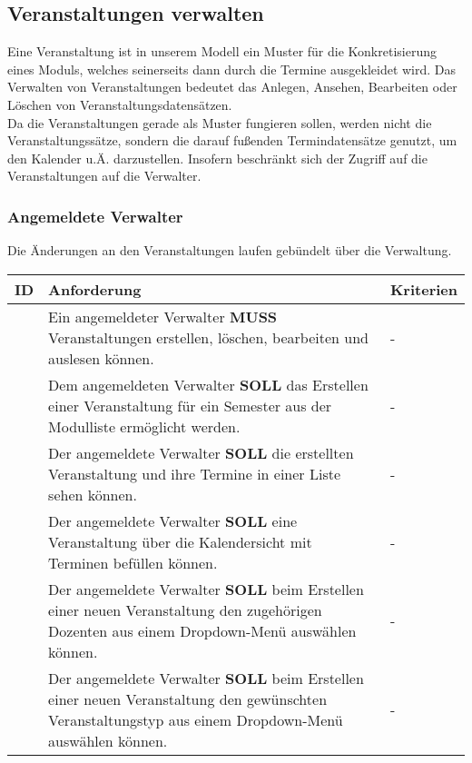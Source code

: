 \newpage

\subsection{Veranstaltungen verwalten}
Eine Veranstaltung ist in unserem Modell ein Muster für die Konkretisierung eines Moduls, welches seinerseits dann durch die Termine ausgekleidet wird. Das Verwalten von Veranstaltungen 
bedeutet das Anlegen, Ansehen, Bearbeiten oder Löschen von Veranstaltungsdatensätzen.\\
Da die Veranstaltungen gerade als Muster fungieren sollen,  werden nicht die Veranstaltungssätze, sondern die darauf fußenden Termindatensätze genutzt, um den Kalender u.Ä. darzustellen. Insofern beschränkt sich der Zugriff auf die Veranstaltungen auf die Verwalter.

\vspace{12pt}

\subsubsection{Angemeldete Verwalter }
Die Änderungen an den Veranstaltungen laufen gebündelt über die Verwaltung.

\vspace{12pt}

\begin{tabular} {|p{}|p{}|p{}|}
	\hline
	ID & Anforderung & Kriterien \\
	\hline
	\printfreqnr
	& Ein angemeldeter Verwalter \textbf{MUSS} Veranstaltungen erstellen, löschen, bearbeiten und auslesen können.
	& - \\
	\hline
	\printfreqnr
	& Dem angemeldeten Verwalter \textbf{SOLL} das Erstellen einer Veranstaltung für ein Semester aus der Modulliste ermöglicht werden.
	& - \\
	\hline
	\printfreqnr
	& Der angemeldete Verwalter \textbf{SOLL} die erstellten Veranstaltung und ihre Termine in einer Liste sehen können. 
	& - \\
	\hline
	\printfreqnr
	& Der angemeldete Verwalter \textbf{SOLL} eine Veranstaltung über die Kalendersicht mit Terminen befüllen können.
	& - \\
	\hline
	\printfreqnr
	& Der angemeldete Verwalter \textbf{SOLL} beim Erstellen einer neuen Veranstaltung den zugehörigen Dozenten aus einem Dropdown-Menü auswählen können.
	& - \\
	\hline
	\printfreqnr
	& Der angemeldete Verwalter \textbf{SOLL} beim Erstellen einer neuen Veranstaltung den gewünschten Veranstaltungstyp aus einem Dropdown-Menü auswählen können.
	& - \\
	\hline
\end{tabular}

